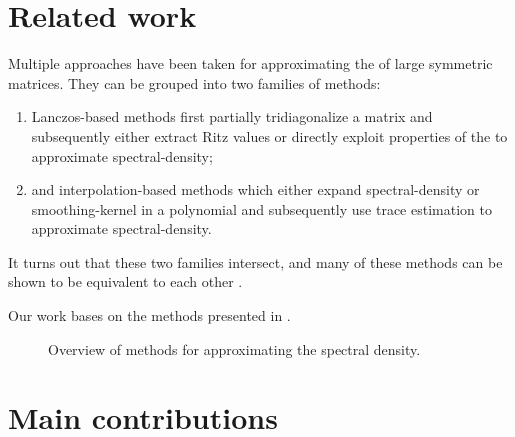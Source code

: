 
\section{Related work}
\label{sec:1-introduction-related}

Multiple approaches have been taken for approximating the 
of large symmetric matrices. They can be grouped into two families of methods:

\begin{enumerate}
    \item Lanczos-based methods
    first partially tridiagonalize a matrix and subsequently either extract Ritz values
    \cite{lin2016review, chen2021slq} or directly exploit properties of the
     \cite{haydock1972electronic, lin2016review}
    to approximate \gls{spectral-density};
    \item and interpolation-based methods which either expand
    \gls{spectral-density} \cite{weisse2006kpm} or \gls{smoothing-kernel}
    \cite{lin2016review,lin2017randomized} in a polynomial and subsequently
    use trace estimation to approximate \gls{spectral-density}.
\end{enumerate}


It turns out that these two families intersect, and many of these methods
can be shown to be equivalent to each other \cite{chen2023kpm}.\\


Our work bases on the methods presented in \cite{lin2017randomized}.

\begin{figure}[ht]
    \centering
    
    \caption{Overview of methods for approximating the spectral density.}
    \label{fig:1-introduction-literature-overview}
\end{figure}


\section{Main contributions}
\label{sec:1-introduction-contributions}

